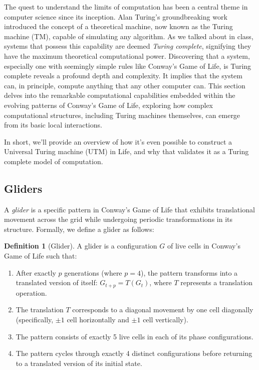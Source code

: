 \documentclass{article}
\theoremstyle{definition}
\newtheorem{definition}{Definition}[section]
\theoremstyle{plain}
\theoremstyle{plain}
\begin{document}
The quest to understand the limits of computation has been a central theme in computer science since its inception. Alan Turing's groundbreaking work introduced the concept of a theoretical machine, now known as the Turing machine (TM), capable of simulating any algorithm. As we talked about in class, systems that possess this capability are deemed \textit{Turing complete}, signifying they have the maximum theoretical computational power. Discovering that a system, especially one with seemingly simple rules like Conway's Game of Life, is Turing complete reveals a profound depth and complexity. It implies that the system can, in principle, compute anything that any other computer can. This section delves into the remarkable computational capabilities embedded within the evolving patterns of Conway's Game of Life, exploring how complex computational structures, including Turing machines themselves, can emerge from its basic local interactions.

In short, we'll provide an overview of how it's even possible to construct a Universal Turing machine (UTM) in Life, and why that validates it as a Turing complete model of computation.

\subsection{Gliders}

A \textit{glider} is a specific pattern in Conway's Game of Life that exhibits translational movement across the grid while undergoing periodic transformations in its structure. Formally, we define a glider as follows:

\begin{definition}[Glider]
A glider is a configuration $G$ of live cells in Conway's Game of Life such that:
\begin{enumerate}
    \item After exactly $p$ generations (where $p = 4$), the pattern transforms into a translated version of itself: $G_{t+p} = T(G_t)$, where $T$ represents a translation operation.
    \item The translation $T$ corresponds to a diagonal movement by one cell diagonally (specifically, $\pm 1$ cell horizontally and $\pm 1$ cell vertically).
    \item The pattern consists of exactly 5 live cells in each of its phase configurations.
    \item The pattern cycles through exactly 4 distinct configurations before returning to a translated version of its initial state.
\end{enumerate}
\end{definition}
\end{document}
